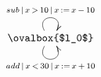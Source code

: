$\xymatrix{
   \ovalbox{$l_0$} \ar@(ul,ur)[]^{sub\,|\,x\,>\,10\,|\,x\,:=\,x\,-\,10} \ar@(dl,dr)[]_{add\,|\,x\,<\,30\,|\,x\,:=\,x\,+\,10}
}$
